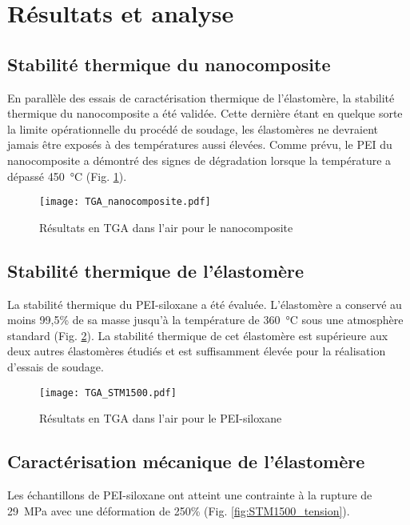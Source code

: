 \FloatBarrier
\section{Résultats et analyse}

\subsection{Stabilité thermique du nanocomposite}

En parallèle des essais de caractérisation thermique de l'élastomère, la stabilité thermique du nanocomposite a été validée. 
Cette dernière étant en quelque sorte la limite opérationnelle du procédé de soudage, les élastomères ne devraient jamais être exposés à des températures aussi élevées. 
Comme prévu, le PEI du nanocomposite a démontré des signes de dégradation lorsque la température a dépassé \SI[locale=FR]{450}{\celsius} (Fig. \ref{fig:TGA_nanocomposite}). 

\begin{figure}[htb]
	\centering
	\texttt{[image: TGA\_nanocomposite.pdf]}
	\caption{Résultats en TGA dans l'air pour le nanocomposite}
	\label{fig:TGA_nanocomposite}
\end{figure}

\FloatBarrier
\subsection{Stabilité thermique de l'élastomère}

La stabilité thermique du PEI-siloxane a été évaluée. 
L'élastomère a conservé au moins 99,5\% de sa masse jusqu'à la température de \SI[locale=FR]{360}{\celsius} sous une atmosphère standard (Fig. \ref{fig:TGA_STM1500}). 
La stabilité thermique de cet élastomère est supérieure aux deux autres élastomères étudiés et est suffisamment élevée pour la réalisation d'essais de soudage. 

\begin{figure}[h]
	\centering
	\texttt{[image: TGA\_STM1500.pdf]}
	\caption{Résultats en TGA dans l'air pour le PEI-siloxane}
	\label{fig:TGA_STM1500}
\end{figure}

\FloatBarrier
\subsection{Caractérisation mécanique de l'élastomère}

Les échantillons de PEI-siloxane ont atteint une contrainte à la rupture de \SI[locale=FR]{29}{\mega\pascal} avec une déformation de 250\% (Fig. \ref{fig:STM1500_tension}). 


